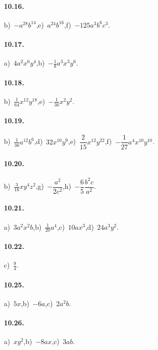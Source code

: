 \paragraph{10.16.} b)~$-a^{28}b^{14}$,\quad e)~$a^{24}b^{16}$,\quad f)~$-125a^{3}b^{6}c^{3}$.

\paragraph{10.17.} a)~$4a^{2}x^{6}y^{4}$,\quad b)~$-\frac{1}{8}a^{3}x^{3}y^{6}$.

\paragraph{10.18.} b)~$\frac{1}{64}x^{12}y^{18}$,\quad e)~$-\frac{1}{36}x^{2}y^{2}$.

\paragraph{10.19.} b)~$\frac{1}{36}a^{12}b^{6}$,\quad d)~$32x^{10}y^{9}$,\quad e)~$\dfrac{2}{15}x^{12}y^{22}$,\quad f)~$-\dfrac{1}{27}a^{4}x^{10}y^{10}$.

\paragraph{10.20.} b)~$\frac{3}{16}xy^{4}z^{2}$,\quad g)~$-\dfrac{a^2}{2c^2}$,\quad h)~$-\dfrac{6}{5}\dfrac{b^2c}{a^2}$.

\paragraph{10.21.} a)~$3a^{2}x^{2}b$,\quad b)~$\frac{1}{20}a^{4}$,\quad c)~$10ax^{3}$,\quad d)~$24a^{3}y^{2}$.

\paragraph{10.22.} c)~$\frac{9}{4}$.

\paragraph{10.25.} a)~$5x$,\quad b)~$-6a$,\quad c)~$2a^{2}b$.

\paragraph{10.26.} a)~$xy^{2}$,\quad b)~$-8ax$,\quad c)~$3ab$.

